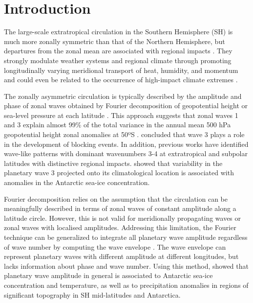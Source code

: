 \documentclass[pdflatex,sn-basic]{sn-jnl}
\theoremstyle{thmstyleone}%
\theoremstyle{thmstyletwo}%
\theoremstyle{thmstylethree}%
\begin{document}



\maketitle

\hypertarget{introduction}{%
\section{Introduction}\label{introduction}}

The large-scale extratropical circulation in the Southern Hemisphere (SH) is much more zonally symmetric than that of the Northern Hemisphere, but departures from the zonal mean are associated with regional impacts \citep[e.g.][]{hoskins2005}.
They strongly modulate weather systems and regional climate through promoting longitudinally varying meridional transport of heat, humidity, and momentum \citep{trenberth1980a, raphael2007} and could even be related to the occurrence of high-impact climate extremes \citep{pezza2012}.

The zonally asymmetric circulation is typically described by the amplitude and phase of zonal waves obtained by Fourier decomposition of geopotential height or sea-level pressure at each latitude \citep[e.g.][]{vanloon1972, trenberth1980a, turner2017}.
This approach suggests that zonal waves 1 and 3 explain almost 99\% of the total variance in the annual mean 500 hPa geopotential height zonal anomalies at 50ºS \citep{vanloon1972}.
\citet{trenberth1985} concluded that wave 3 plays a role in the development of blocking events.
In addition, previous works have identified wave-like patterns with dominant wavenumbers 3-4 at extratropical and subpolar latitudes with distinctive regional impacts.
\citet{raphael2007} showed that variability in the planetary wave 3 projected onto its climatological location is associated with anomalies in the Antarctic sea-ice concentration.

Fourier decomposition relies on the assumption that the circulation can be meaningfully described in terms of zonal waves of constant amplitude along a latitude circle.
However, this is not valid for meridionally propagating waves or zonal waves with localised amplitudes.
Addressing this limitation, the Fourier technique can be generalized to integrate all planetary wave amplitude regardless of wave number by computing the wave envelope \citep{irving2015}.
The wave envelope can represent planetary waves with different amplitude at different longitudes, but lacks information about phase and wave number.
Using this method, \citet{irving2015} showed that planetary wave amplitude in general is associated to Antarctic sea-ice concentration and temperature, as well as to precipitation anomalies in regions of significant topography in SH mid-latitudes and Antarctica.
\end{document}
